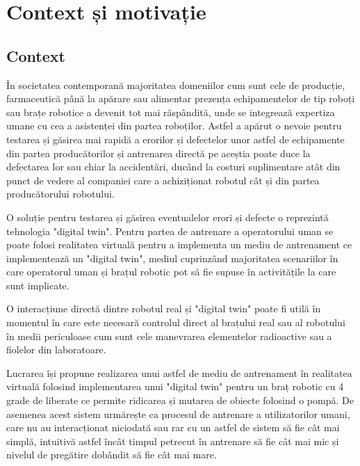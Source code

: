 


\clearpage




 \setcounter{page}{6}
\section{Context și motivație}

\subsection{Context}

În societatea contemporană majoritatea domeniilor cum sunt cele de producție, farmaceutică până la apărare sau alimentar prezența echipamentelor de tip roboți sau brațe robotice a devenit tot mai răspândită, unde se  integrează expertiza umane cu cea a asistenței din partea roboților. Astfel a apărut o nevoie pentru testarea și găsirea mai rapidă a erorilor și defectelor unor astfel de echipamente din partea producătorilor și antrenarea directă pe aceștia poate duce la defectarea lor sau chiar la accidentări, ducând la costuri suplimentare atât din punct de vedere al companiei care a achiziționat robotul cât și din partea producătorului robotului.

O soluție pentru testarea și găsirea eventualelor erori și defecte o reprezintă tehnologia "digital twin". Pentru partea de antrenare a operatorului uman se poate folosi realitatea virtuală pentru a implementa un mediu de antrenament ce implementează un "digital twin", mediul cuprinzând majoritatea scenariilor în care operatorul uman și brațul robotic pot să fie supuse în activitățile la care sunt implicate.


O interacțiune directă dintre robotul real și "digital twin" poate fi utilă în momentul în care este necesară controlul direct al brațului real sau al robotului în medii periculoase cum sunt cele manevrarea elementelor radioactive sau a fiolelor din laboratoare.

Lucrarea își propune realizarea unui astfel de mediu de antrenament în realitatea virtuală folosind implementarea unui  "digital twin"  pentru un braț robotic cu 4 grade de liberate ce permite ridicarea și mutarea de obiecte folosind o pompă. De asemenea acest sistem urmărește ca procesul de antrenare a utilizatorilor umani, care nu au interacționat niciodată sau rar cu un astfel de sistem să fie cât mai simplă, intuitivă astfel încât timpul petrecut în antrenare să fie cât mai mic și nivelul de pregătire dobândit să fie cât mai mare.


